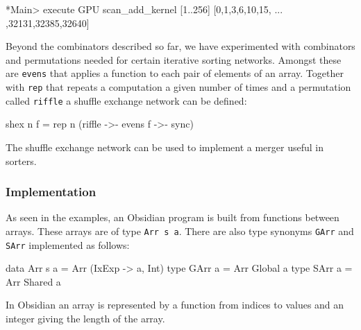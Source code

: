 



\begin{code}
*Main> execute GPU scan_add_kernel [1..256]
[0,1,3,6,10,15, ... ,32131,32385,32640] 
\end{code}


Beyond the combinators described so far, we have experimented with combinators 
and permutations  needed for certain iterative sorting networks. Amongst these 
are {\tt evens} that applies a function to each pair of elements of an array. 
Together with {\tt rep} that repeats a computation a given number of times and 
a permutation called {\tt riffle} a shuffle exchange network can be defined: 


\begin{code}
shex n f = rep n (riffle ->- evens f ->- sync)
\end{code}

The shuffle exchange network can be used to implement a merger useful in sorters. 


\subsubsection{Implementation} 

As seen in the examples, an Obsidian program is built from functions between 
arrays. These arrays are of type {\tt Arr s a}. There are also type synonyms
{\tt GArr} and {\tt SArr} implemented as follows: 

\begin{code}
data Arr s a = Arr (IxExp ->  a, Int)
type GArr a = Arr Global a
type SArr a = Arr Shared a 
\end{code}
In Obsidian an array is represented by a function from indices to values and an 
integer giving the length of the array.

